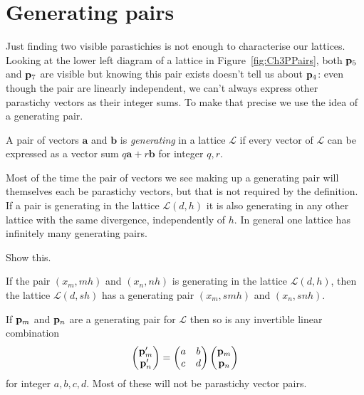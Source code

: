 \section{Generating pairs}
Just finding two visible parastichies is not enough to characterise our lattices.  Looking at the lower left diagram of a lattice in Figure~\ref{fig:Ch3PPairs}, both ${\mathbf p}_{5}$ and ${\mathbf p}_{7}$ are visible but knowing this pair exists doesn't tell us about ${\mathbf p}_{4}$: even though the pair  are linearly independent, we can't always express other parastichy vectors as their integer sums.  To make that precise we use the idea of a generating pair. 
\begin{definition} A pair of vectors $\mathbf{a}$ and $\mathbf{b}$
		   is \emph{generating} in a lattice $\mathcal{L}$ if every vector of $\mathcal{L}$ can be expressed as a vector sum $q\mathbf{a}+r\mathbf{b}$
		   for integer $q,r$.
\label{def:g}
\end{definition}
 Most of the time the pair of vectors we see making up a generating pair will themselves each be parastichy vectors, but that is not required by the definition. If a pair is generating in the lattice $\mathcal{L}(d,h)$ it is also generating in any other lattice with the same divergence, independently of $h$. In general one lattice has infinitely many generating pairs. 
\begin{jExercise}
	Show this.
\end{jExercise}
\begin{jAnswer}
	If the pair $(x_m, m h)$ and $(x_n,n h)$ is generating in the lattice $\mathcal{L}(d,h)$, then the lattice  $\mathcal{L}(d, s h )$ has a generating pair $(x_m, s m h)$ and $(x_n,s n h)$.
	
	If ${\mathbf p}_{m}$ and ${\mathbf p}_{n}$ are a generating pair for $\mathcal{L}$ then so is any invertible linear combination
	\begin{equation}
		\begin{pmatrix}
		{\mathbf p}_{m}' \\ {\mathbf p}_{n}' 
		\end{pmatrix}= 
	\begin{pmatrix}
		a & b  \\ c & d  
	\end{pmatrix}	\begin{pmatrix}
	{\mathbf p}_{m} \\ {\mathbf p}_{n} 
\end{pmatrix}
	\end{equation}
	for integer $a,b,c,d$. Most of these will not be parastichy vector pairs.
\end{jAnswer}

